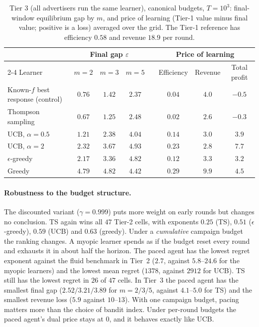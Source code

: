 \documentclass[11pt]{article}
\theoremstyle{remark}
\begin{document}
\begin{table}[t]
\centering\small
\caption{Tier 3 (all advertisers run the same learner), canonical budgets, $T=10^3$: final-window
equilibrium gap by $m$, and price of learning (Tier-1 value minus final value; positive is a loss)
averaged over the grid. The Tier-1 reference has efficiency $0.58$ and revenue $18.9$ per round.}
\label{tab:t3}
\begin{tabular}{@{}lccccccc@{}}
\toprule
 & \multicolumn{3}{c}{Final gap $\varepsilon$} & & \multicolumn{3}{c}{Price of learning}\\
\cmidrule{2-4}\cmidrule{6-8}
Learner & $m=2$ & $m=3$ & $m=5$ & & Efficiency & Revenue & Total profit\\
\midrule
Known-$f$ best response (control) & $0.76$ & $1.42$ & $2.37$ & & $0.04$ & $4.0$ & $-0.5$\\
Thompson sampling & $\mathbf{0.67}$ & $\mathbf{1.25}$ & $2.48$ & & $\mathbf{0.02}$ & $\mathbf{2.6}$ & $-0.3$\\
UCB, $\alpha=0.5$ & $1.21$ & $2.38$ & $4.04$ & & $0.14$ & $3.0$ & $3.9$\\
UCB, $\alpha=2$ & $2.32$ & $3.67$ & $4.93$ & & $0.23$ & $2.8$ & $7.7$\\
$\epsilon$-greedy & $2.17$ & $3.36$ & $4.82$ & & $0.12$ & $3.3$ & $3.2$\\
Greedy & $4.79$ & $4.82$ & $4.42$ & & $0.29$ & $9.9$ & $4.5$\\
\bottomrule
\end{tabular}
\end{table}

\paragraph{Robustness to the budget structure.} The discounted variant ($\gamma=0.999$) puts more weight on
early rounds but changes no conclusion. TS again wins all $47$ Tier-2 cells, with exponents $0.25$ (TS),
$0.51$ ($\epsilon$-greedy), $0.59$ (UCB) and $0.63$ (greedy). Under a \emph{cumulative} campaign budget
the ranking changes. A myopic learner spends as if the budget reset every round and exhausts it in about half
the horizon. The paced agent has the lowest regret exponent against the fluid benchmark in Tier~2
($2.7$, against $5.8$--$24.6$ for the myopic learners) and the lowest mean regret ($1378$, against
$2912$ for UCB). TS still has the lowest regret in $26$ of $47$ cells. In Tier~3 the paced agent has the
smallest final gap ($2.52/3.21/3.89$ for $m=2/3/5$, against $4.1$--$5.0$ for TS) and the smallest
revenue loss ($5.9$ against $10$--$13$). With one campaign budget, pacing matters more than the choice
of bandit index. Under per-round budgets the paced agent's dual price stays at $0$, and it behaves
exactly like UCB.
\end{document}
